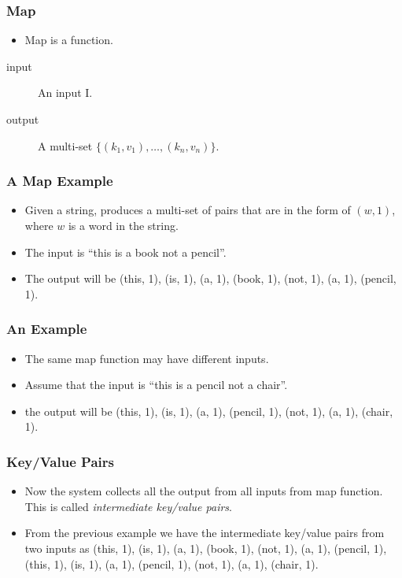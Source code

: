 \documentclass{beamer}
\begin{document}
\begin{frame}
  \frametitle{Map}
  \begin{itemize}
    \item Map is a function.
  \end{itemize}
  \begin{description}
  \item[input] An input I.
  \item[output] A multi-set $\{ (k_1, v_1), \ldots , (k_n, v_n) \}$.
  \end{description}
\end{frame}

\begin{frame}
  \frametitle{A Map Example} 
  \begin{itemize}
    \item Given a string, produces a multi-set of pairs that are in
      the form of $(w, 1)$, where $w$ is a word in the string.
    \item The input is ``this is a book not a pencil''.
    \item The output will be (this, 1), (is, 1), (a, 1), (book,
      1), (not, 1), (a, 1), (pencil, 1).
  \end{itemize}
\end{frame}

\begin{frame}
  \frametitle{An Example} 
  \begin{itemize}
    \item The same map function may have different inputs.
    \item Assume that the input is ``this is a pencil not a chair''.
    \item the output will be (this, 1), (is, 1), (a, 1), (pencil,
      1), (not, 1), (a, 1), (chair, 1).
  \end{itemize}
\end{frame}

\begin{frame}
  \frametitle{Key/Value Pairs}
  \begin{itemize}
    \item Now the system collects all the output from all inputs from
      map function.  This is called {\em intermediate key/value
        pairs}.
    \item From the previous example we have the intermediate key/value
      pairs from two inputs as (this, 1), (is, 1), (a, 1), (book,
      1), (not, 1), (a, 1), (pencil, 1), (this, 1), (is, 1), (a, 1),
      (pencil, 1), (not, 1), (a, 1), (chair, 1).
  \end{itemize}
\end{frame}
\end{document}
